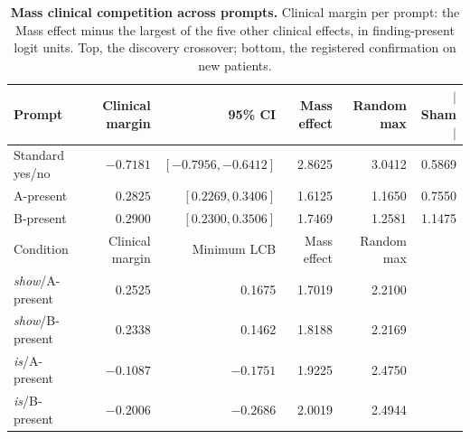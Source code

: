 \begin{table}[H]
\centering
\scriptsize
\setlength{\tabcolsep}{5pt}
\caption{\textbf{Mass clinical competition across prompts.} Clinical margin per prompt: the Mass effect minus the largest of the five other clinical effects, in finding-present logit units. Top, the discovery crossover; bottom, the registered confirmation on new patients.}
\label{tab:seed-mass}
\begin{tabular}{lrrrrr}
\toprule
Prompt & Clinical margin & 95\% CI & Mass effect & Random max & $|$Sham$|$ \\
\midrule
Standard yes/no & $-0.7181$ & $[-0.7956,-0.6412]$ & 2.8625 & 3.0412 & 0.5869 \\
A-present & $0.2825$ & $[0.2269,0.3406]$ & 1.6125 & 1.1650 & 0.7550 \\
B-present & $0.2900$ & $[0.2300,0.3506]$ & 1.7469 & 1.2581 & 1.1475 \\
\midrule
Condition & Clinical margin & Minimum LCB & Mass effect & Random max & \\
\midrule
\textit{show}/A-present & 0.2525 & 0.1675 & 1.7019 & 2.2100 & \\
\textit{show}/B-present & 0.2338 & 0.1462 & 1.8188 & 2.2169 & \\
\textit{is}/A-present & $-0.1087$ & $-0.1751$ & 1.9225 & 2.4750 & \\
\textit{is}/B-present & $-0.2006$ & $-0.2686$ & 2.0019 & 2.4944 & \\
\bottomrule
\end{tabular}
\end{table}

